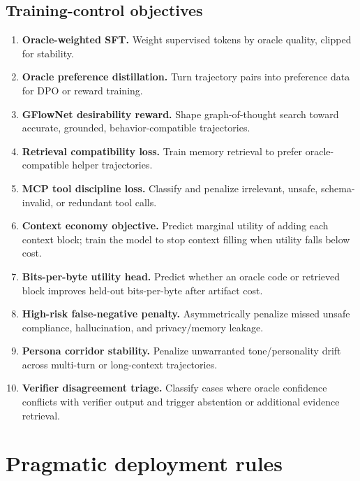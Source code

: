 \documentclass[11pt]{article}
\numberwithin{equation}{section}
\begin{document}
\subsection{Training-control objectives}
\begin{enumerate}[resume]
\item \textbf{Oracle-weighted SFT.} Weight supervised tokens by oracle quality, clipped for stability.
\item \textbf{Oracle preference distillation.} Turn trajectory pairs into preference data for DPO or reward training.
\item \textbf{GFlowNet desirability reward.} Shape graph-of-thought search toward accurate, grounded, behavior-compatible trajectories.
\item \textbf{Retrieval compatibility loss.} Train memory retrieval to prefer oracle-compatible helper trajectories.
\item \textbf{MCP tool discipline loss.} Classify and penalize irrelevant, unsafe, schema-invalid, or redundant tool calls.
\item \textbf{Context economy objective.} Predict marginal utility of adding each context block; train the model to stop context filling when utility falls below cost.
\item \textbf{Bits-per-byte utility head.} Predict whether an oracle code or retrieved block improves held-out bits-per-byte after artifact cost.
\item \textbf{High-risk false-negative penalty.} Asymmetrically penalize missed unsafe compliance, hallucination, and privacy/memory leakage.
\item \textbf{Persona corridor stability.} Penalize unwarranted tone/personality drift across multi-turn or long-context trajectories.
\item \textbf{Verifier disagreement triage.} Classify cases where oracle confidence conflicts with verifier output and trigger abstention or additional evidence retrieval.
\end{enumerate}

\section{Pragmatic deployment rules}
\end{document}
